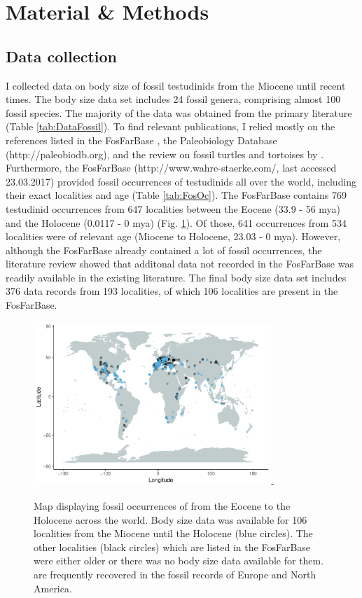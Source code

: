 \section{Material \& Methods}

\subsection{Data collection}
I collected data on body size of fossil testudinids from the Miocene until recent times. The body size data set includes 24 fossil genera, comprising almost 100 fossil species. The majority of the data was obtained from the primary literature (Table \ref{tab:DataFossil}). To find relevant publications, I relied mostly on the references listed in the FosFarBase \citep{Bohme2003b}, the Paleobiology Database (http://paleobiodb.org), and the review on fossil turtles and tortoises by \cite{Rhodin2015}.
Furthermore, the FosFarBase (http://www.wahre-staerke.com/, last accessed 23.03.2017) provided fossil occurrences of testudinids all over the world, including their exact localities and age (Table \ref{tab:FosOc}). The FosFarBase contains 769 testudinid occurrences from 647 localities between the Eocene (33.9 - 56 mya) and the Holocene (0.0117 - 0 mya) (Fig. \ref{fig:mapOc}). Of those, 641 occurrences from 534 localities were of relevant age (Miocene to Holocene, 23.03 - 0 mya). However, although the FosFarBase already contained a lot of fossil occurrences, the literature review showed that additonal data not recorded in the FosFarBase was readily available in the existing literature.
The final body size data set includes 376 data records from 193 localities, of which 106 localities are present in the FosFarBase.


 \begin{figure}[htbp]
 	\centering
 	\includegraphics[width=0.8\textwidth]{MA_JJ_files/figure-latex/MapFossilOccurrences-1.pdf}-
 	\caption[Fossil occurrences of Testudinidae]{Map displaying fossil occurrences of \T from the Eocene to the Holocene across the world. Body size data was available for 106 localities from the Miocene until the Holocene (blue circles). The other localities (black circles) which are listed in the FosFarBase were either older or there was no body size data available for them. \T are frequently recovered in the fossil records of Europe and North America.}
 	\label{fig:mapOc}
 \end{figure}

